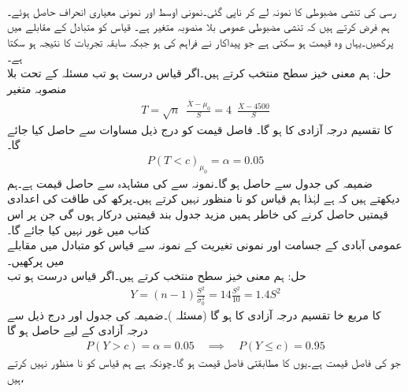 \quad {}\\
رسی کی تنشی مضبوطی  کا نمونہ لے کر ناپی گئی۔نمونی اوسط  اور نمونی معیاری انحراف  حاصل ہوئے۔ ہم فرض کرتے ہیں کہ تنشی مضبوطی عمومی بلا منصوبہ  متغیر ہے۔ قیاس  کو متبادل  کے مقابلے میں پرکھیں۔یہاں  وہ قیمت ہو سکتی ہے جو پیداکار نے فراہم کی ہو جبکہ  سابقہ تجربات کا نتیجہ ہو سکتا ہے۔\\
حل:\quad
ہم معنی خیز سطح  منتخب کرتے ہیں۔اگر قیاس درست ہو تب مسئلہ  کے تحت  بلا منصوبہ متغیر
\begin{align*}
T=\sqrt{n}\,\,\,\frac{\overline{X}-\mu_0}{S}=4\,\,\, \frac{\overline{X}-4500}{S}
\end{align*}
کا  تقسیم  درجہ آزادی کا ہو گا۔ فاصل قیمت  کو درج ذیل مساوات سے حاصل کیا جائے گا۔
\begin{align*}
P(T<c)_{\mu_0}=\alpha=0.05
\end{align*}
ضمیمہ  کی جدول  سے  حاصل ہو گا۔نمونہ سے  کی مشاہدہ سے حاصل قیمت  ہے۔ہم دیکھتے ہیں کہ  ہے لہٰذا ہم قیاس کو نا منظور نہیں کرتے ہیں۔پرکھ کی طاقت کی اعدادی قیمتیں حاصل کرنے کی خاطر ہمیں مزید جدول بند قیمتیں درکار ہوں گی جن پر اس کتاب میں غور نہیں کیا جائے گا۔
\quad {}\\
عمومی آبادی کے  جسامت اور نمونی تغیریت   کے نمونہ سے قیاس  کو متبادل
  میں مقابلے میں پرکھیں۔\\
حل:\quad
ہم معنی خیز سطح  منتخب کرتے ہیں۔اگر قیاس درست ہو تب 
\begin{align*}
Y=(n-1)\frac{S^2}{\sigma^2_0}=14\frac{S^2}{10}=1.4S^2
\end{align*}
کا مربع خا تقسیم  درجہ آزادی کا ہو گا (مسئلہ )۔ضمیمہ  کی جدول  اور درج ذیل سے   درجہ آزادی کے لیے    حاصل ہو گا 
\begin{align*}
P(Y>c)=\alpha=0.05\quad \implies \quad P(Y\le c)=0.95
\end{align*}
جو  کی فاصل قیمت ہے۔یوں  کا مطابقتی فاصل قیمت  ہو گا۔چونکہ  ہے ہم قیاس کو نا منظور نہیں کرتے ہیں،

